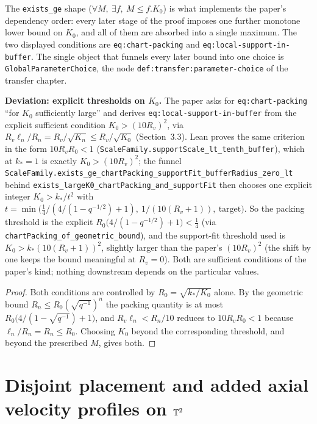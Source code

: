 The \texttt{exists\_ge} shape ($\forall M,\ \exists f,\ M\leq f.K_0 $) is what implements
the paper's dependency order: every later stage of the proof imposes one further
monotone lower bound on $K_0 $, and all of them are absorbed into a single maximum.  The
two displayed conditions are \texttt{eq:chart-packing} and
\texttt{eq:local-support-in-buffer}.  The single object that funnels every later bound
into one choice is \texttt{GlobalParameterChoice}, the node
\texttt{def:transfer:parameter-choice} of the transfer chapter.

\textbf{Deviation: explicit thresholds on $K_0 $.}  The paper asks for
\texttt{eq:chart-packing} ``for $K_0 $ sufficiently large'' and derives
\texttt{eq:local-support-in-buffer} from the explicit sufficient condition
$K_0>(10R_v)^2 $, via $R_v\ell_n/R_n=R_v/\sqrt{K_n}\leq R_v/\sqrt{K_0} $ (Section~3.3).  Lean
proves the same criterion in the form $10R_vR_0<1 $
(\texttt{ScaleFamily.supportScale\_lt\_tenth\_buffer}), which at $k_*=1 $ is exactly
$K_0>(10R_v)^2 $; the funnel
\texttt{ScaleFamily.exists\_ge\_chartPacking\_supportFit\_bufferRadius\_zero\_lt} behind
\texttt{exists\_largeK0\_chartPacking\_and\_supportFit} then chooses one explicit integer
$K_0>k_*/t^2 $ with
$t=\min\bigl(\tfrac14/(4/(1-q^{-1/2})+1),\ 1/(10(R_v+1)),\ \text{target}\bigr) $.  So the
packing threshold is the explicit $R_0\bigl(4/(1-q^{-1/2})+1\bigr)<\tfrac14 $ (via
\texttt{chartPacking\_of\_geometric\_bound}), and the support-fit threshold used
is $K_0>k_*(10(R_v+1))^2 $, slightly larger than the paper's $(10R_v)^2 $ (the shift by one
keeps the bound meaningful at $R_v=0 $).  Both are sufficient conditions of the paper's kind;
nothing downstream depends on the particular values.

\begin{proof}
  \leanok
  Both conditions are controlled by $R_0=\sqrt{k_*/K_0} $ alone.  By the geometric bound
  $R_n\leq R_0(\sqrt{q^{-1}})^n $ the packing quantity is at most
  $R_0\bigl(4/(1-\sqrt{q^{-1}})+1\bigr) $, and $R_v\ell_n<R_n/10 $ reduces to
  $10R_vR_0<1 $ because $\ell_n/R_n=R_n\leq R_0 $.  Choosing $K_0 $ beyond the corresponding
  threshold, and beyond the prescribed $M $, gives both.
\end{proof}

\section{Disjoint placement and added axial velocity profiles on $\mathbb{T}^2$}

